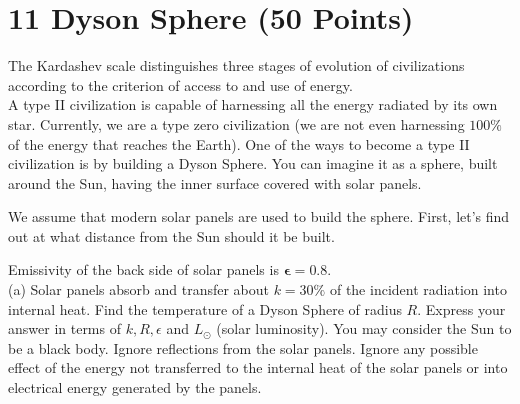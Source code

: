 \documentclass[10pt]{article}
\begin{document}
\section*{11 Dyson Sphere (50 Points)}
The Kardashev scale distinguishes three stages of evolution of civilizations according to the criterion of access to and use of energy.\\
A type II civilization is capable of harnessing all the energy radiated by its own star. Currently, we are a type zero civilization (we are not even harnessing $100 \%$ of the energy that reaches the Earth). One of the ways to become a type II civilization is by building a Dyson Sphere. You can imagine it as a sphere, built around the Sun, having the inner surface covered with solar panels.

We assume that modern solar panels are used to build the sphere. First, let's find out at what distance from the Sun should it be built.

Emissivity of the back side of solar panels is $\boldsymbol{\epsilon}=0.8$.\\
(a) Solar panels absorb and transfer about $k=30 \%$ of the incident radiation into internal heat. Find the temperature of a Dyson Sphere of radius $R$. Express your answer in terms of $k, R, \epsilon$ and $L_{\odot}$ (solar luminosity). You may consider the Sun to be a black body. Ignore reflections from the solar panels. Ignore any possible effect of the energy not transferred to the internal heat of the solar panels or into electrical energy generated by the panels.
\end{document}

